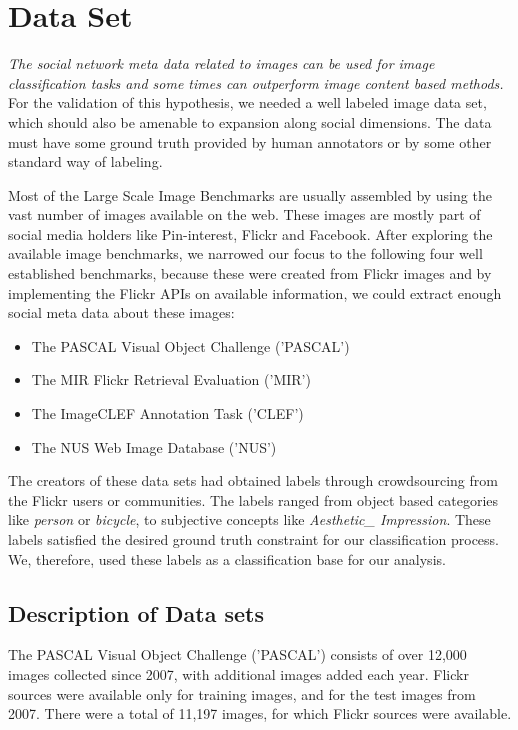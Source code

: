 
\chapter{Data Set} %

\label{Chapter3} %
\emph{The social network meta data related to images can be used for
image classification tasks and some times can outperform image
content based methods.} For the validation of this
hypothesis, we needed a well labeled image data set, which should also
be amenable to expansion along social dimensions.
The data must have some ground truth provided by human annotators or
by some other standard way of labeling.

Most of the Large Scale Image Benchmarks are usually assembled by
using the vast number of images available on the web. These images
are  mostly part of social media holders like Pin-interest,
Flickr and Facebook. After exploring the available image benchmarks,
we narrowed our focus to the following four well established
benchmarks, because these were created from Flickr images and by
implementing the Flickr APIs on available information, we could
extract enough social meta data about these images:
\begin{itemize}
\item The PASCAL Visual Object Challenge ('PASCAL') \cite{PASCAL}
\item The MIR Flickr Retrieval Evaluation ('MIR') \cite{MIR}
\item The ImageCLEF Annotation Task ('CLEF') \cite{CLEF}
\item The NUS Web Image Database ('NUS') \cite{NUS}
\end{itemize}
The creators of these data sets had obtained labels through
crowdsourcing from the Flickr users  or communities. The labels
ranged from object based categories like \textit{person} or \textit{bicycle}, to
subjective concepts like \textit{Aesthetic\_ Impression}. These
labels satisfied the desired ground truth constraint for our
classification process. We, therefore, used these labels as a
classification base for our analysis.

\section{Description of Data sets}
The PASCAL Visual Object Challenge ('PASCAL') consists of over
12,000 images collected since 2007, with additional images added
each year. Flickr sources were available only for
training images, and for the test images from 2007. There were a total
of 11,197 images, for which Flickr sources were available.

